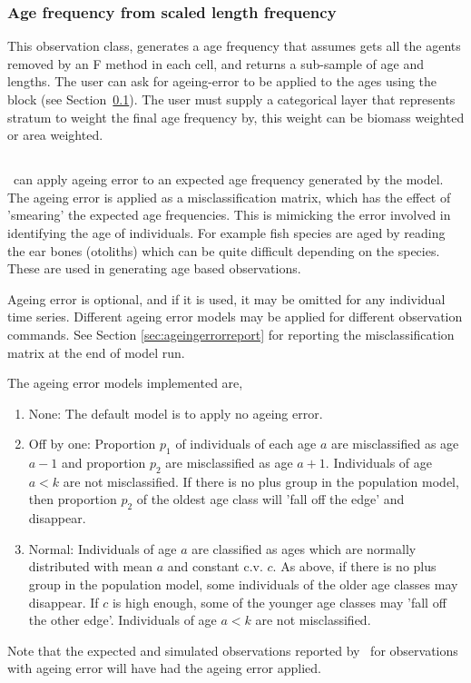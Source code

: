 \subsubsection{Age frequency from scaled length frequency}\label{subsubsec:Mortalitysubsamle}
This observation class, generates a age frequency that assumes  gets all the agents removed by an F method in each cell, and returns a sub-sample of age and lengths. The user can ask for ageing-error to be applied to the ages using the  block (see Section~\ref{subsec:ageing_error}). The user must supply a categorical layer that represents stratum to weight the final age frequency by, this weight can be biomass weighted or area weighted.


\subsection{}\label{subsec:ageing_error}
\IBM\ can apply ageing error to an expected age frequency generated by the model. The ageing error is applied as a misclassification matrix, which has the effect of 'smearing' the expected age frequencies. This is mimicking the error involved in identifying the age of individuals. For example fish species are aged by reading the ear bones (otoliths) which can be quite difficult depending on the species. These are used in generating age based observations. 

Ageing error is optional, and if it is used, it may be omitted for any individual time series. Different ageing error models may be applied for different observation commands. See Section \ref{sec:ageingerrorreport} for reporting the misclassification matrix at the end of model run.

The ageing error models implemented are,
\begin{enumerate}
	\item{None}: The default model is to apply no ageing error.
	\item{Off by one}: Proportion $p_1$ of individuals of each age $a$ are misclassified as age $a-1$ and proportion $p_2$ are misclassified as age $a+1$. Individuals of age $a < k$ are not misclassified. If there is no plus group in the population model, then proportion $p_2$ of the oldest age class will 'fall off the edge' and disappear. 
	\item{Normal}: Individuals of age $a$ are classified as ages which are normally distributed with mean $a$ and constant c.v. $c$. As above, if there is no plus group in the population model, some individuals of the older age classes may disappear. If $c$ is high enough, some of the younger age classes may 'fall off the other edge'. Individuals of age $a < k$ are not misclassified.
\end{enumerate}

Note that the expected and simulated observations reported by \IBM\ for observations with ageing error will have had the ageing error applied. 


